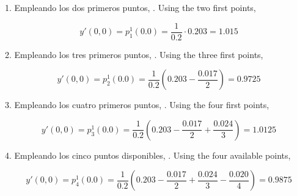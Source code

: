\begin{paracol}{2}
1. Empleando los dos primeros puntos,
. Using the two first points,
\end{paracol}
\begin{equation*}
y'(0,0)=p_1^1(0.0)=\frac{1}{0.2}\cdot 0.203= 1.015
\end{equation*}
\begin{paracol}{2}
2. Empleando los tres primeros puntos,
. Using the three first points,
\end{paracol}
\begin{equation*}
y'(0,0)=p_2^1(0.0)=\frac{1}{0.2}\left( 0.203-\frac{0.017}{2}\right)= 0.9725
\end{equation*}
\begin{paracol}{2}
3. Empleando los cuatro primeros puntos,
. Using the four first points,
\end{paracol}
\begin{equation*}
y'(0,0)=p_3^1(0.0)=\frac{1}{0.2}\left( 0.203-\frac{0.017}{2}+\frac{0.024}{3}\right)= 1.0125
\end{equation*}
\begin{paracol}{2}
4. Empleando los cinco puntos disponibles,
. Using the four available points,
\end{paracol}
\begin{equation*}
y'(0,0)=p_4^1(0.0)=\frac{1}{0.2}\left( 0.203-\frac{0.017}{2}+\frac{0.024}{3}-\frac{0.020}{4}\right)= 0.9875
\end{equation*}

